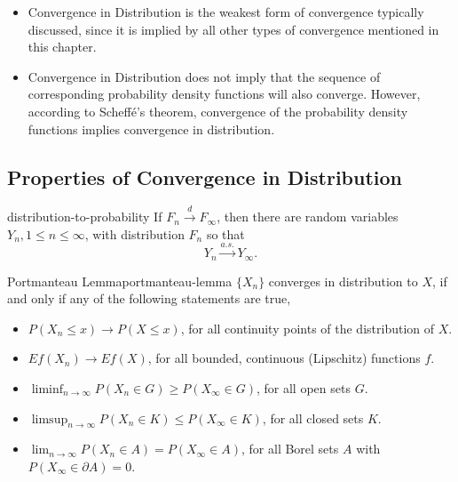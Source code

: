 \begin{note}
    \begin{itemize}
        \item Convergence in Distribution is the weakest form of convergence typically discussed, since it is implied by all other types of convergence mentioned in this chapter.
        \item Convergence in Distribution does not imply that the sequence of corresponding probability density functions will also converge. However, according to Scheff\'e's theorem, convergence of the probability density functions implies convergence in distribution.
    \end{itemize}
\end{note}

\subsection{Properties of Convergence in Distribution}

\begin{lemma}{}{distribution-to-probability}
    If $F_n\stackrel{d}{\rightarrow}F_\infty$, then there are random variables $Y_n,1\leq n\leq \infty$, with distribution $F_n$ so that
    \begin{equation}
        Y_n\stackrel{a.s.}{\rightarrow}Y_\infty.
    \end{equation}
\end{lemma}

\begin{lemma}{Portmanteau Lemma}{portmanteau-lemma}
    $\{X_n\}$ converges in distribution to $X$, if and only if any of the following statements are true,
    \begin{itemize}
        \item $P(X_n\leq x)\rightarrow P(X\leq x)$, for all continuity points of the distribution of $X$.
        \item $Ef(X_n)\rightarrow Ef(X)$, for all bounded, continuous (Lipschitz) functions $f$.
        \item $\liminf_{n\rightarrow\infty}P\left(X_{n} \in G\right)\geq P\left(X_{\infty}\in G\right)$, for all open sets $G$.
        \item $\limsup_{n \rightarrow\infty}P\left(X_{n} \in K\right) \leq P\left(X_{\infty} \in K\right)$, for all closed sets $K$.
        \item $\lim_{n\rightarrow\infty}P\left(X_{n}\in A\right)=P\left(X_{\infty}\in A\right)$, for all Borel sets $A$ with $P\left(X_{\infty}\in \partial A\right)=0$.
    \end{itemize}
\end{lemma}

